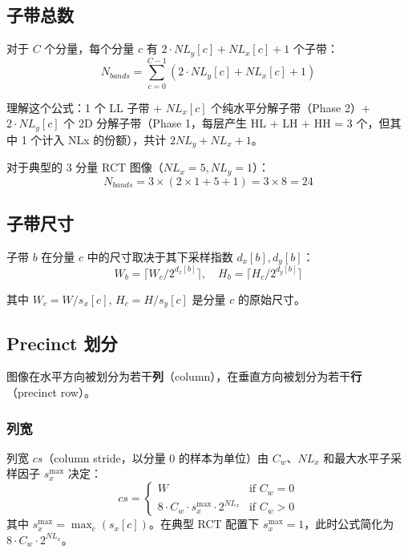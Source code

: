 \subsection{子带总数}

对于 $C$ 个分量，每个分量 $c$ 有 $2 \cdot NL_y[c] + NL_x[c] + 1$ 个子带：
\begin{equation}
N_{\mathit{bands}} = \sum_{c=0}^{C-1} (2 \cdot NL_y[c] + NL_x[c] + 1)
\end{equation}

理解这个公式：1 个 LL 子带 + $NL_x[c]$ 个纯水平分解子带（Phase 2）+ $2 \cdot NL_y[c]$ 个 2D 分解子带（Phase 1，每层产生 HL + LH + HH = 3 个，但其中 1 个计入 NLx 的份额），共计 $2 NL_y + NL_x + 1$。

对于典型的 3 分量 RCT 图像（$NL_x = 5, NL_y = 1$）：
\begin{equation}
N_{\mathit{bands}} = 3 \times (2 \times 1 + 5 + 1) = 3 \times 8 = 24
\end{equation}

\subsection{子带尺寸}

子带 $b$ 在分量 $c$ 中的尺寸取决于其下采样指数 $d_x[b], d_y[b]$：
\begin{equation}
W_b = \lceil W_c / 2^{d_x[b]} \rceil, \quad H_b = \lceil H_c / 2^{d_y[b]} \rceil
\end{equation}

其中 $W_c = W / s_x[c]$, $H_c = H / s_y[c]$ 是分量 $c$ 的原始尺寸。

\subsection{Precinct 划分}

图像在水平方向被划分为若干\textbf{列}（column），在垂直方向被划分为若干\textbf{行}（precinct row）。

\subsubsection{列宽}

列宽 $\mathit{cs}$（column stride，以分量 0 的样本为单位）由 $C_w$、$NL_x$ 和最大水平子采样因子 $s_x^{\max}$ 决定：
\begin{equation}
\mathit{cs} = \begin{cases} W & \text{if } C_w = 0 \\ 8 \cdot C_w \cdot s_x^{\max} \cdot 2^{NL_x} & \text{if } C_w > 0 \end{cases}
\end{equation}
其中 $s_x^{\max} = \max_c(s_x[c])$。在典型 RCT 配置下 $s_x^{\max} = 1$，此时公式简化为 $8 \cdot C_w \cdot 2^{NL_x}$。

